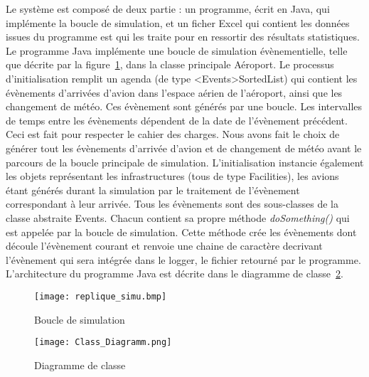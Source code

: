 


Le système est composé de deux partie : un programme, écrit en Java,  qui implémente la boucle de simulation, et un ficher Excel qui contient les données issues du programme est qui les traite pour en ressortir des résultats statistiques.
\\
Le programme Java implémente une boucle de simulation évènementielle, telle que décrite par la figure~\ref{replique}, dans la classe principale Aéroport. 
Le processus d'initialisation remplit un agenda (de type <Events>SortedList) qui contient les évènements d'arrivées d'avion dans l'espace aérien de l'aéroport, ainsi que les changement de météo. Ces évènement sont générés par une boucle. 
Les intervalles de temps entre les évènements dépendent de la date de l'évènement précédent. Ceci est fait pour respecter le cahier des charges. 
Nous avons fait le choix de générer tout les évènements d'arrivée d'avion et de changement de météo avant le parcours de la boucle principale de simulation. L'initialisation instancie également les objets représentant les infrastructures (tous de type Facilities), les avions étant générés durant la simulation par le traitement de l'évènement correspondant à leur arrivée.
Tous les évènements sont des sous-classes de la classe abstraite Events. Chacun contient sa propre méthode \textit{doSomething()} qui est appelée par la boucle de simulation. Cette méthode crée les évènements dont découle l'évènement courant et renvoie une chaine de caractère decrivant l'évènement qui sera intégrée dans le logger, le fichier retourné par le programme.
L'architecture du programme Java est décrite dans le diagramme de classe~\ref{class_diagramm}.

 \begin{figure}[h]
   \caption{\label{replique} Boucle de simulation}
 \texttt{[image: replique\_simu.bmp]}
 \end{figure}

\begin{figure}[h]
   \caption{\label{class_diagramm} Diagramme de classe}
 \texttt{[image: Class\_Diagramm.png]}
 \end{figure}
 
